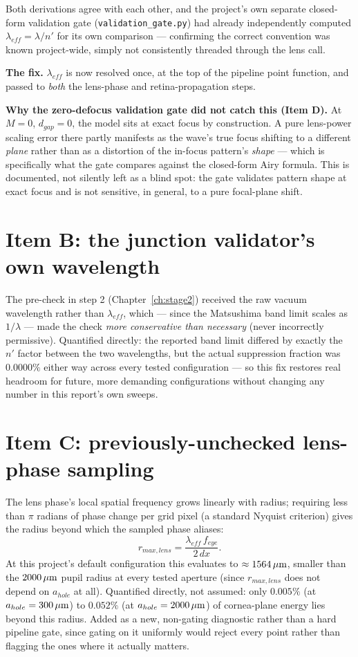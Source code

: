 Both derivations agree with each other, and the project's own separate closed-form
validation gate (\texttt{validation\_gate.py}) had already independently computed
$\lambda_{eff}=\lambda/n'$ for its own comparison --- confirming the correct convention
was known project-wide, simply not consistently threaded through the lens call.

\textbf{The fix.} $\lambda_{eff}$ is now resolved once, at the top of the pipeline
point function, and passed to \emph{both} the lens-phase and retina-propagation steps.

\textbf{Why the zero-defocus validation gate did not catch this (Item D).} At $M=0$,
$d_{gap}=0$, the model sits at exact focus by construction. A pure lens-power scaling
error there partly manifests as the wave's true focus shifting to a different
\emph{plane} rather than as a distortion of the in-focus pattern's \emph{shape} ---
which is specifically what the gate compares against the closed-form Airy formula.
This is documented, not silently left as a blind spot: the gate validates pattern
shape at exact focus and is not sensitive, in general, to a pure focal-plane shift.

\section{Item B: the junction validator's own wavelength}

The pre-check in step 2 (Chapter~\ref{ch:stage2}) received the raw vacuum wavelength
rather than $\lambda_{eff}$, which --- since the Matsushima band limit scales as
$1/\lambda$ --- made the check \emph{more conservative than necessary} (never
incorrectly permissive). Quantified directly: the reported band limit differed by
exactly the $n'$ factor between the two wavelengths, but the actual suppression
fraction was $0.0000\%$ either way across every tested configuration --- so this fix
restores real headroom for future, more demanding configurations without changing any
number in this report's own sweeps.

\section{Item C: previously-unchecked lens-phase sampling}

The lens phase's local spatial frequency grows linearly with radius; requiring less
than $\pi$ radians of phase change per grid pixel (a standard Nyquist criterion) gives
the radius beyond which the sampled phase aliases:
\begin{equation}
r_{max,lens} = \frac{\lambda_{eff}\, f_{eye}}{2\,dx}.
\end{equation}
At this project's default configuration this evaluates to $\approx1564\,\mu\text{m}$, smaller
than the $2000\,\mu\text{m}$ pupil radius at every tested aperture (since $r_{max,lens}$ does not
depend on $a_{hole}$ at all). Quantified directly, not assumed: only $0.005\%$
(at $a_{hole}=300\,\mu\text{m}$) to $0.052\%$ (at $a_{hole}=2000\,\mu\text{m}$) of cornea-plane energy
lies beyond this radius. Added as a new, non-gating diagnostic rather than a hard
pipeline gate, since gating on it uniformly would reject every point rather than
flagging the ones where it actually matters.

